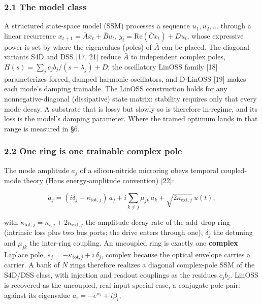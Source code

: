 \documentclass[
  10pt,
]{article}
\begin{document}
\subsubsection{2.1 The model class}\label{the-model-class}

A structured state-space model (SSM) processes a sequence
\(u_1, u_2, \dots\) through a linear recurrence
\(x_{t+1} = \bar A x_t + \bar B u_t\),
\(y_t = \mathrm{Re}(\bar C x_t) + D u_t\), whose expressive power is set
by where the eigenvalues (poles) of \(\bar A\) can be placed. The
diagonal variants S4D and DSS {[}17, 21{]} reduce \(\bar A\) to
independent complex poles,
\(H(s) = \sum_j c_j b_j/(s - \lambda_j) + D\); the oscillatory LinOSS
family {[}18{]} parameterizes forced, damped harmonic oscillators, and
D-LinOSS {[}19{]} makes each mode's damping trainable. The LinOSS
construction holds for any nonnegative-diagonal (dissipative) state
matrix: stability requires only that every mode decay. A substrate that
is lossy but slowly so is therefore in-regime, and its loss is the
model's damping parameter. Where the trained optimum lands in that range
is measured in §6.

\subsubsection{2.2 One ring is one trainable complex
pole}\label{one-ring-is-one-trainable-complex-pole}

The mode amplitude \(a_j\) of a silicon-nitride microring obeys temporal
coupled-mode theory (Haus energy-amplitude convention) {[}22{]}:

\[\dot a_j = (i\delta_j - \kappa_{\mathrm{tot},j})\,a_j
+ i\sum_{k\neq j}\mu_{jk}\,a_k + \sqrt{2\kappa_{\mathrm{ext},j}}\,u(t),\]

with
\(\kappa_{\mathrm{tot},j} = \kappa_{i,j} + 2\kappa_{\mathrm{ext},j}\)
the amplitude decay rate of the add--drop ring (intrinsic loss plus two
bus ports; the drive enters through one), \(\delta_j\) the detuning and
\(\mu_{jk}\) the inter-ring coupling. An uncoupled ring is exactly one
\textbf{complex} Laplace pole,
\(s_j = -\kappa_{\mathrm{tot},j} + i\,\delta_j\), complex because the
optical envelope carries a carrier. A bank of \(N\) rings therefore
realizes a diagonal complex-pole SSM of the S4D/DSS class, with
injection and readout couplings as the residues \(c_j b_j\). LinOSS is
recovered as the uncoupled, real-input special case, a conjugate pole
pair: against its eigenvalue \(a_i = -e^{\alpha_i} + i\beta_i\),
\end{document}
